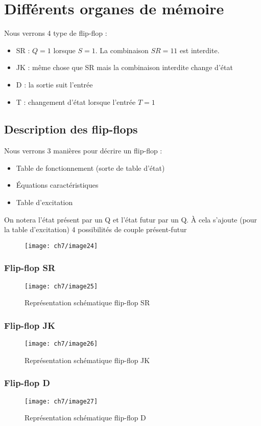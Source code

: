 \section{Différents organes de mémoire}
Nous verrons 4 type de flip-flop :
\begin{itemize}
	\item SR : $Q=1$ lorsque $S=1$. La combinaison $SR=11$ est interdite.
	\item JK : même chose que SR mais la combinaison interdite change d'état
	\item D : la sortie suit l'entrée
	\item T : changement d'état lorsque l'entrée $T=1$
\end{itemize}
\subsection{Description des flip-flops}
Nous verrons 3 manières pour décrire un flip-flop :
\begin{itemize}
	\item Table de fonctionnement (sorte de table d'état)
	\item Équations caractéristiques
	\item Table d'excitation 
\end{itemize}
On notera l'état présent par un Q et l'état futur par un Q\up{+}. À cela s'ajoute (pour la table d'excitation) 4 possibilités de couple présent-futur
\begin{figure}[H]
	\centering
	\texttt{[image: ch7/image24]}
\end{figure}
\subsubsection{Flip-flop SR}
\begin{figure}[H]
	\centering
	\texttt{[image: ch7/image25]}
	\caption{Représentation schématique flip-flop SR}
\end{figure}
\subsubsection{Flip-flop JK}
\begin{figure}[H]
	\centering
	\texttt{[image: ch7/image26]}
	\caption{Représentation schématique flip-flop JK}
\end{figure}
\subsubsection{Flip-flop D}
\begin{figure}[H]
	\centering
	\texttt{[image: ch7/image27]}
	\caption{Représentation schématique flip-flop D}
\end{figure}
